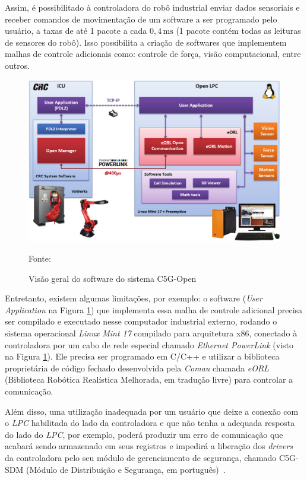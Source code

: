     Assim, é possibilitado à controladora do robô industrial enviar dados sensoriais e receber comandos de movimentação de um software a ser programado pelo usuário, a taxas de até 1 pacote a cada $0,4\,\mathrm{ms}$ (1 pacote contém todas as leituras de sensores do robô). Isso possibilita a criação de softwares que implementem malhas de controle adicionais como: controle de força, visão computacional, entre outros.~\citep{Ferrara:2013}
    
    \begin{figure}[ht]
        \centering
        \includegraphics[width=\columnwidth]{imagens/Conexoes/controladora.png}
        \small 
        \centering 
        \caption{Visão geral do software do sistema C5G-Open}
        Fonte:~\citep{Open:Manual}
        \label{controladora}
    \end{figure} 
    
    Entretanto, existem algumas limitações, por exemplo: o software (\textit{User Application} na Figura \ref{controladora}) que implementa essa malha de controle adicional precisa ser compilado e executado nesse computador industrial externo, rodando o sistema operacional \textit{Linux Mint 17} compilado para arquitetura x86, conectado à controladora por um cabo de rede especial chamado \textit{Ethernet PowerLink} (visto na Figura \ref{controladora}). Ele precisa ser programado em C/C++ e utilizar a biblioteca proprietária de código fechado desenvolvida pela \textit{Comau} chamada \textit{eORL} (Biblioteca Robótica Realística Melhorada, em tradução livre) para controlar a comunicação.
    
    Além disso, uma utilização inadequada por um usuário que deixe a conexão com o \textit{LPC} habilitada do lado da controladora e que não tenha a adequada resposta do lado do \textit{LPC}, por exemplo, poderá produzir um erro de comunicação que acabará sendo armazenado em seus registros e impedirá a liberação dos \textit{drivers} da controladora pelo seu módulo de gerenciamento de segurança, chamado C5G-SDM (Módulo de Distribuição e Segurança, em português)~\citep{C5G:Manual}.
    
